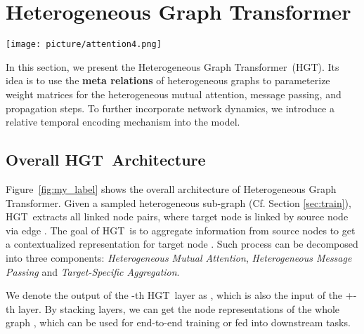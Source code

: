 \documentclass[sigconf]{acmart}
\theoremstyle{definition}
\newcommand{\model}{Heterogeneous Graph Transformer}
\newcommand{\short}{HGT}
\begin{document}
\section{Heterogeneous Graph Transformer}\label{sec:approach}
\begin{figure*}[ht!]
    \centering
    \texttt{[image: picture/attention4.png]}
    \caption{The Overall Architecture of Heterogeneous Graph Transformer. 
    \textmd{ Given a sampled heterogeneous sub-graph with  as the target node,  \&  as source nodes, the \short\ model takes its edges  \&  and their corresponding meta relations  \&  as input to learn a  contextualized representation  for each node, which can be used for downstream  tasks. 
    Color decodes the node type. 
    HGT includes three components: (1) meta relation-aware heterogeneous mutual attention,  (2) heterogeneous message passing from source nodes, and (3) target-specific heterogeneous message aggregation.}}
    \label{fig:my_label}
\end{figure*} 







In this section, we present the \model\ (\short). Its  idea is to use the \textbf{meta relations} of heterogeneous graphs to parameterize weight matrices for the heterogeneous mutual attention, message passing, and propagation steps. 
To further incorporate network dynamics, we introduce a relative temporal encoding mechanism into the model.




\subsection{Overall \short\ Architecture}

Figure~\ref{fig:my_label} shows the overall architecture of \model. Given a sampled heterogeneous sub-graph (Cf. Section \ref{sec:train}), \short\ extracts all linked node pairs, where target node  is linked by source node  via edge . The goal of \short\ is to aggregate information from source nodes to get a contextualized representation for target node . Such process can be decomposed into three components: \textit{Heterogeneous Mutual Attention}, \textit{Heterogeneous Message Passing} and \textit{Target-Specific Aggregation}. 

We denote the output of the -th \short\ layer as , which is also the input of the +-th layer. 
By stacking  layers, we can get the node representations of the whole graph , which can be used for end-to-end training or fed into downstream tasks.  
\end{document}
